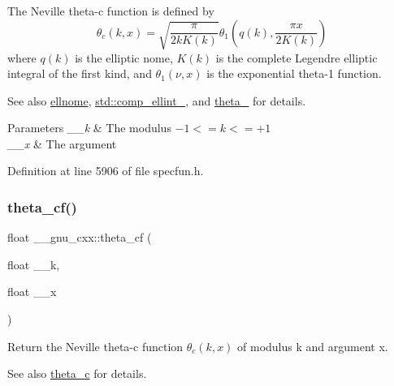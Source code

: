 The Neville theta-\/c function is defined by \[ \theta_c(k,x) = \sqrt{\frac{\pi}{2 k K(k)}} \theta_1\left(q(k),\frac{\pi x}{2K(k)}\right) \] where $ q(k) $ is the elliptic nome, $ K(k) $ is the complete Legendre elliptic integral of the first kind, and $ \theta_1(\nu,x) $ is the exponential theta-\/1 function. \begin{DoxySeeAlso}{See also}
\hyperlink{group__mathsf__gnu_ga7bfb34f8b5c0ed7c72040f9cb7034bba}{ellnome}, \hyperlink{group__mathsf__std_gad559217fb01e7a8b7a6e23eeedda64be}{std\+::comp\+\_\+ellint\+\_}, and \hyperlink{group__mathsf__gnu_gaa2e5a3a5f550fe032a596a8b01c878c0}{theta\+\_} for details.
\end{DoxySeeAlso}

\begin{DoxyParams}{Parameters}
{\em \+\_\+\+\_\+k} & The modulus $ -1 <= k <= +1 $ \\
\hline
{\em \+\_\+\+\_\+x} & The argument \\
\hline
\end{DoxyParams}


Definition at line 5906 of file specfun.\+h.

\mbox{\label{group__mathsf__gnu_ga409f898afeaad5e25726ad552cfe6946}} 
\subsubsection{\texorpdfstring{theta\+\_\+cf()}{theta\_cf()}}
{\footnotesize\ttfamily float \+\_\+\+\_\+gnu\+\_\+cxx\+::theta\+\_\+cf (\begin{DoxyParamCaption}\item[{float}]{\+\_\+\+\_\+k,  }\item[{float}]{\+\_\+\+\_\+x }\end{DoxyParamCaption})\hspace{0.3cm}{\ttfamily [inline]}}

Return the Neville theta-\/c function $ \theta_c(k,x) $ of modulus {\ttfamily k} and argument {\ttfamily x}.

\begin{DoxySeeAlso}{See also}
\hyperlink{group__mathsf__gnu_ga3ebbb6513c39e1d55b08cba7d169ce3d}{theta\+\_\+c} for details. 
\end{DoxySeeAlso}


